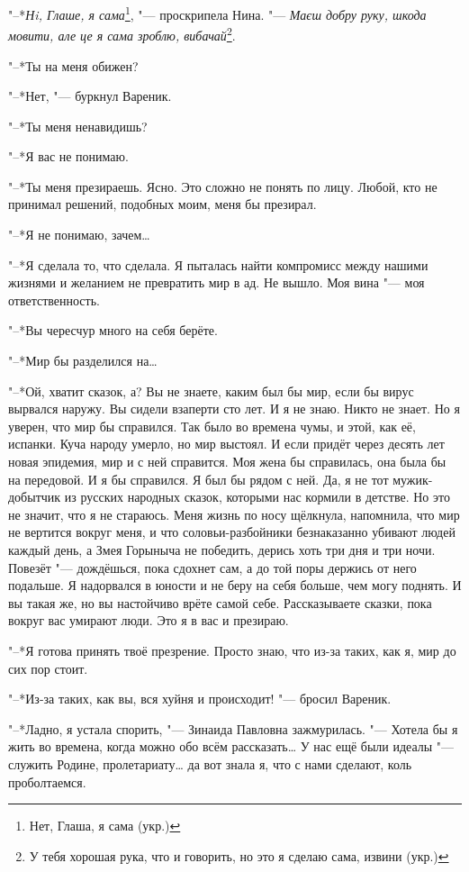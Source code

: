 "--*\textit{Нi, Глаше, я сама}\footnote{Нет, Глаша, я сама (укр.)}, "--- проскрипела Нина.
"--- \textit{Маєш добру руку, шкода мовити, але це я сама зроблю, вибачай}\footnote{У тебя хорошая рука, что и говорить, но это я сделаю сама, извини (укр.)}.

\asterism

"--*Ты на меня обижен?

"--*Нет, "--- буркнул Вареник.

"--*Ты меня ненавидишь?

"--*Я вас не понимаю.

"--*Ты меня презираешь.
Ясно.
Это сложно не понять по лицу.
Любой, кто не принимал решений, подобных моим, меня бы презирал.

"--*Я не понимаю, зачем\ldots{}

"--*Я сделала то, что сделала.
Я пыталась найти компромисс между нашими жизнями и желанием не превратить мир в ад.
Не вышло.
Моя вина "--- моя ответственность.

"--*Вы чересчур много на себя берёте.

"--*Мир бы разделился на\ldots{}

"--*Ой, хватит сказок, а?
Вы не знаете, каким был бы мир, если бы вирус вырвался наружу.
Вы сидели взаперти сто лет.
И я не знаю.
Никто не знает.
Но я уверен, что мир бы справился.
Так было во времена чумы, и этой, как её, испанки.
Куча народу умерло, но мир выстоял.
И если придёт через десять лет новая эпидемия, мир и с ней справится.
Моя жена бы справилась, она была бы на передовой.
И я бы справился.
Я был бы рядом с ней.
Да, я не тот мужик-добытчик из русских народных сказок, которыми нас кормили в детстве.
Но это не значит, что я не стараюсь.
Меня жизнь по носу щёлкнула, напомнила, что мир не вертится вокруг меня, и что соловьи-разбойники безнаказанно убивают людей каждый день, а Змея Горыныча не победить, дерись хоть три дня и три ночи.
Повезёт "--- дождёшься, пока сдохнет сам, а до той поры держись от него подальше.
Я надорвался в юности и не беру на себя больше, чем могу поднять.
И вы такая же, но вы настойчиво врёте самой себе.
Рассказываете сказки, пока вокруг вас умирают люди.
Это я в вас и презираю.

"--*Я готова принять твоё презрение.
Просто знаю, что из-за таких, как я, мир до сих пор стоит.

"--*Из-за таких, как вы, вся хуйня и происходит! "--- бросил Вареник.

"--*Ладно, я устала спорить, "--- Зинаида Павловна зажмурилась.
"--- Хотела бы я жить во времена, когда можно обо всём рассказать\ldots{}
У нас ещё были идеалы "--- служить Родине, пролетариату\ldots{} да вот знала я, что с нами сделают, коль проболтаемся.

